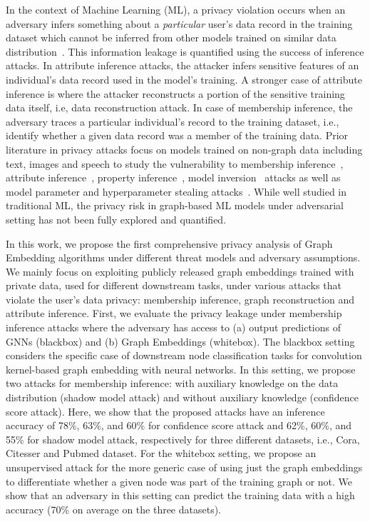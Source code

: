 In the context of Machine Learning (ML), a privacy violation occurs when an adversary infers something about a \textit{particular} user's data record in the training dataset which cannot be inferred from other models trained on similar data distribution~\cite{membershipinf,whitebox}.
This information leakage is quantified using the success of inference attacks. %
In attribute inference attacks, the attacker infers sensitive features of an individual's data record used in the model's training.
A stronger case of attribute inference is where the attacker reconstructs a portion of the sensitive training data itself, i.e, data reconstruction attack.
In case of membership inference, the adversary traces a particular individual's record to the training dataset, i.e., identify whether a given data record was a member of the training data.
Prior literature in privacy attacks focus on models trained on non-graph data including text, images and speech to study the vulnerability to membership inference~\cite{ndss19salem,membershipinf}, attribute inference~\cite{attributeinf,attributeinf2}, property inference~\cite{propertyinf}, model inversion~\cite{modelinversion} attacks as well as model parameter and hyperparameter stealing attacks~\cite{timing,stealml,8418595}.
While well studied in traditional ML, the privacy risk in graph-based ML models under adversarial setting has not been fully explored and quantified. %



In this work, we propose the first comprehensive privacy analysis of Graph Embedding algorithms under different threat models and adversary assumptions.
We mainly focus on exploiting publicly released graph embeddings trained with private data, used for different downstream tasks, under various attacks that violate the user's data privacy: membership inference, graph reconstruction and attribute inference.
First, we evaluate the privacy leakage under membership inference attacks where the adversary has access to (a) output predictions of GNNs (blackbox) and (b) Graph Embeddings (whitebox).
The blackbox setting considers the specific case of downstream node classification tasks for convolution kernel-based graph embedding with neural networks.
In this setting, we propose two attacks for membership inference: with auxiliary knowledge on the data distribution (shadow model attack) and without auxiliary knowledge (confidence score attack).
Here, we show that the proposed attacks have an inference accuracy of 78\%, 63\%, and 60\% for confidence score attack and 62\%, 60\%, and 55\% for shadow model attack, respectively for three different datasets, i.e., Cora, Citesser and Pubmed dataset.
For the whitebox setting, we propose an unsupervised attack for the more generic case of using just the graph embeddings to differentiate whether a given node was part of the training graph or not.
We show that an adversary in this setting can predict the training data with a high accuracy (70\% on average on the three datasets).


